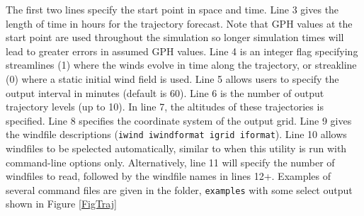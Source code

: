 \documentclass[11pt]{article}   %
\begin{document}
The first two lines specify the start point in space and time.  Line 3 gives the length of time
in hours for the trajectory forecast.  Note that GPH values at the start point are
used throughout the simulation so longer simulation times will lead to greater errors in
assumed GPH values.  Line 4 is an integer flag specifying streamlines (1) where the winds
evolve in time along the trajectory, or streakline (0) where a static initial wind
field is used.
Line 5 allows users to specify the output interval in minutes (default is 60).  Line 6
is the number of output trajectory levels (up to 10).  In line 7, the altitudes of
these trajectories is specified.
Line 8 specifies the coordinate system of the output grid.
Line 9 gives the windfile descriptions (\texttt{iwind iwindformat igrid iformat}).
Line 10 allows windfiles to be spelected automatically, similar to when this utility
is run with command-line options only.  Alternatively, line 11 will specify the number
of windfiles to read, followed by the windfile names in lines 12+.
Examples of several command files are given in the folder, \texttt{examples} with some
select output shown in Figure \ref{FigTraj}
\end{document}
